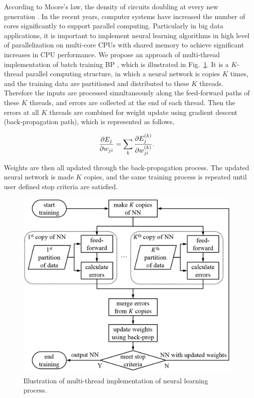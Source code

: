 \documentclass[procedia]{easychair}
\begin{document}
According to Moore’s law, the density of circuits doubling at every new generation \cite{chu2007map}.  In the recent years, computer systems have increased the number of cores significantly to support parallel computing.  Particularly in big data applications, it is important to implement neural learning algorithms in high level of parallelization on multi-core CPUs with shared memory to achieve significant increases in CPU performance.  We propose an approach of multi-thread implementation of batch training BP \cite{schuessler2011parallel}, which is illustrated in Fig.~\ref{fig:parallelization}.  It is a $K$-thread parallel computing structure, in which a neural network is copies $K$ times, and the training data are partitioned and distributed to these $K$ threads.  Therefore the inputs are processed simultaneously along the feed-forward paths of these $K$ threads, and errors are collected at the end of each thread.  Then the errors at all $K$ threads are combined for weight update using gradient descent (back-propagation path), which is represented as follows,

\begin{equation}
    \frac{\partial E_j}{\partial w_{ji}} = \sum_k \frac{\partial E_j^{(k)}}{\partial w_{ji}^{(k)}} \text{.} \notag
\end{equation}

Weights are then all updated through the back-propagation process.  The updated neural network is made $K$ copies, and the same training process is repeated until user defined stop criteria are satisfied.

\begin{figure}[tb]
    \begin{centering}
        \includegraphics[scale=0.5]{../pic/parallelization.png}
        \caption{Illustration of multi-thread implementation of neural learning process.}
    \label{fig:parallelization}
	\end{centering}
\end{figure}
\end{document}
